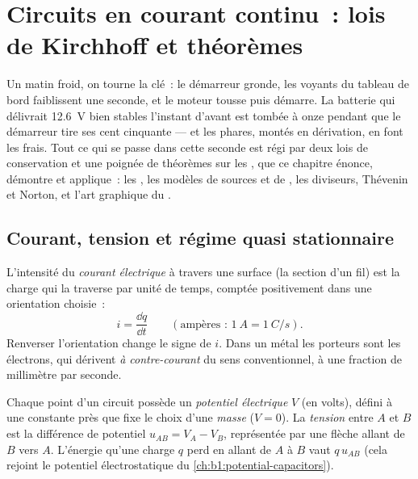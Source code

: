\chapter{Circuits en courant continu~: lois de Kirchhoff et théorèmes}\label{ch:b1:dc-circuits}

Un matin froid, on tourne la clé~: le démarreur gronde, les voyants du
tableau de bord faiblissent une seconde, et le moteur tousse puis
démarre. La batterie qui délivrait \qty{12.6}{V} bien stables l'instant
d'avant est tombée à onze pendant que le démarreur tire ses cent
cinquante  --- et les phares, montés en dérivation, en font les
frais. Tout ce qui se passe dans cette seconde est régi par deux lois de
conservation et une poignée de théorèmes sur les , que
ce chapitre énonce, démontre et applique~: les , les
modèles de sources et de , les diviseurs, Thévenin
et Norton, et l'art graphique du .

\section{Courant, tension et régime quasi stationnaire}

\begin{definition}\label{def:b1:dc-circuits:current}
L'intensité du \emph{courant électrique} à travers une surface (la
section d'un fil) est la charge qui la traverse par unité de temps,
comptée positivement dans une orientation choisie~:
\[
i = \frac{\dd q}{\dd t} \qquad (\text{ampères~: } \qty{1}{A} = \qty{1}{C/s}).
\]
Renverser l'orientation change le signe de $i$. Dans un métal les
porteurs sont les électrons, qui dérivent \emph{à contre-courant} du
sens conventionnel, à une fraction de millimètre par seconde.
\end{definition}

\begin{definition}\label{def:b1:dc-circuits:voltage}
Chaque point d'un circuit possède un \emph{potentiel électrique} $V$
(en volts), défini à une constante près que fixe le choix d'une
\emph{masse} ($V = 0$). La \emph{tension} entre $A$ et $B$ est la
différence de potentiel $u_{AB} = V_A - V_B$, représentée par une flèche
allant de $B$ vers $A$. L'énergie qu'une charge $q$ perd en allant de
$A$ à $B$ vaut $q\,u_{AB}$ (cela rejoint le potentiel électrostatique du
\cref{ch:b1:potential-capacitors}).
\end{definition}

